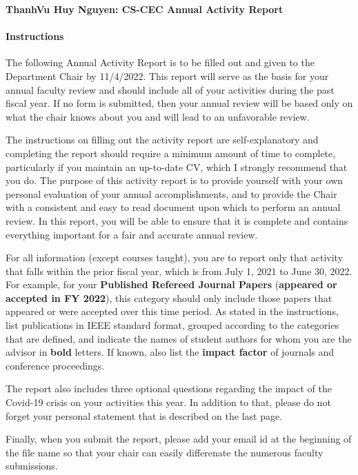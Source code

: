 \documentclass[11pt]{article}
\newcommand{\due}{11/4/2022}
\newcommand{\fy}{2022}
\newcommand{\myname}{ThanhVu Huy Nguyen}
\begin{document}
\thispagestyle{empty}

\begin{center}
  \textbf{\Large {\myname}: CS-CEC Annual Activity Report}
\end{center}

\paragraph{Instructions} The following Annual Activity Report is to be filled out and given to
the Department Chair by \due{}. This report will serve as the
basis for your annual faculty review and should include all of your
activities during the past fiscal year. If no form is submitted, then
your annual review will be based only on what the chair knows about you
and will lead to an unfavorable review.

The instructions on filling out the activity report are self-explanatory
and completing the report should require a minimum amount of time to
complete, particularly if you maintain an up-to-date CV, which I
strongly recommend that you do. The purpose of this activity report is
to provide yourself with your own personal evaluation of your annual
accomplishments, and to provide the Chair with a consistent and easy to
read document upon which to perform an annual review. In this report,
you will be able to ensure that it is complete and contains everything
important for a fair and accurate annual review.

For all information (except courses taught), you are to report only that
activity that falls within the prior fiscal year, which is from July 1,
2021 to June 30, 2022. For example, for your \textbf{Published Refereed
Journal Papers} (\textbf{appeared or accepted in FY \fy{}}), this
category should only include those papers that appeared or were accepted
over this time period. As stated in the instructions, list publications
in IEEE standard format, grouped according to the categories that are
defined, and indicate the names of student authors for whom you are the
advisor in \textbf{bold} letters. If known, also list the \textbf{impact
factor} of journals and conference proceedings.

The report also includes three optional questions regarding the impact
of the Covid-19 crisis on your activities this year. In addition to
that, please do not forget your personal statement that is described on
the last page.

Finally, when you submit the report, please add your email id at the
beginning of the file name so that your chair can easily differenate the
numerous faculty submissions.
\end{document}
